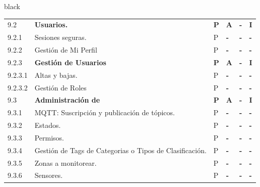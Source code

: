 \documentclass[11pt]{charter}
\begin{document}
\begin{landscape}
\begin{consigna}{black}
\begin{tabularx}{\linewidth}{@{}|p{1.3cm}|p{9.3cm}|p{3cm}|p{3cm}|p{3cm}|p{3cm}|@{}}
9.2                    & \textbf{Usuarios.}                                                                            & \textbf{P} & \textbf{A} & \textbf{-} & \textbf{I} \\
9.2.1                  & Sesiones seguras.                                                                             & P          & \textbf{-} & \textbf{-} & \textbf{-} \\
9.2.2                  & Gestión de Mi Perfil                                                                          & P          & \textbf{-} & \textbf{-} & \textbf{-} \\
9.2.3                  & \textbf{Gestión de Usuarios}                                                                  & \textbf{P} & \textbf{A} & \textbf{-} & \textbf{I} \\
9.2.3.1                & Altas y bajas.                                                                                & P          & \textbf{-} & \textbf{-} & \textbf{-} \\
9.2.3.2                & Gestión de Roles                                                                              & P          & \textbf{-} & \textbf{-} & \textbf{-} \\
9.3                    & \textbf{Administración de}                                                                    & \textbf{P} & \textbf{A} & \textbf{-} & \textbf{I} \\
9.3.1                  & MQTT: Suscripción y publicación   de tópicos.                                                 & P          & \textbf{-} & \textbf{-} & \textbf{-} \\
9.3.2                  & Estados.                                                                                      & P          & \textbf{-} & \textbf{-} & \textbf{-} \\
9.3.3                  & Permisos.                                                                                     & P          & \textbf{-} & \textbf{-} & \textbf{-} \\
9.3.4                  & Gestión de Tags de Categorias o   Tipos de Clasificación.                                     & P          & \textbf{-} & \textbf{-} & \textbf{-} \\
9.3.5                  & Zonas a monitorear.                                                                           & P          & \textbf{-} & \textbf{-} & \textbf{-} \\
9.3.6                  & Sensores.                                                                                     & P          & \textbf{-} & \textbf{-} & \textbf{-} \\

\end{tabularx}
\end{consigna}
\end{landscape}
\end{document}
